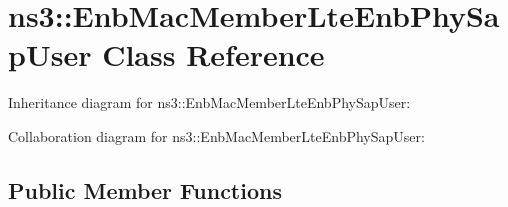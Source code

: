 \hypertarget{classns3_1_1EnbMacMemberLteEnbPhySapUser}{}\section{ns3\+:\+:Enb\+Mac\+Member\+Lte\+Enb\+Phy\+Sap\+User Class Reference}
\label{classns3_1_1EnbMacMemberLteEnbPhySapUser}


Inheritance diagram for ns3\+:\+:Enb\+Mac\+Member\+Lte\+Enb\+Phy\+Sap\+User\+:


Collaboration diagram for ns3\+:\+:Enb\+Mac\+Member\+Lte\+Enb\+Phy\+Sap\+User\+:
\subsection*{Public Member Functions}
